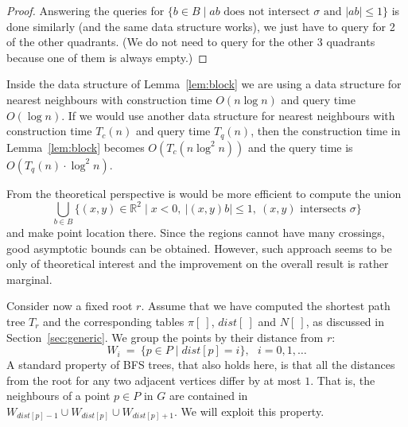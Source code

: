 \documentclass[a4paper,USenglish]{lipics}
\newcommand{\RR}{\ensuremath{\mathbb R}}  %
\def\dist{\mathit{dist}}
\let\le\leqslant
\begin{document}
\begin{proof}
	Answering the queries for 
	$\{ b\in B \mid \text{$ab$ does not intersect $\sigma$ and $|ab|\le 1$}\}$
	is done similarly (and the same data structure works), we just have
	to query for 2 of the other quadrants. (We do not need to query for the
	other 3 quadrants because one of them is always empty.)
\end{proof}

Inside the data structure of Lemma~\ref{lem:block} we are using a data structure
for nearest neighbours with construction time $O(n\log n)$ and query time $O(\log n)$.
If we would use another data structure for nearest neighbours with construction
time $T_c(n)$ and query time $T_q(n)$, then the construction time 
in Lemma~\ref{lem:block} becomes $O(T_c(n\log^2 n))$ and the query time is
$O(T_q(n)\cdot \log^2 n)$.

From the theoretical perspective is would be more efficient to compute the union
\[
	\bigcup_{b\in B} \{ (x,y)\in \RR^2\mid x<0,~ |(x,y)b|\le 1,~ (x,y) 
			\text{ intersects } \sigma \}
\]
and make point location there. Since the regions cannot have many crossings,
good asymptotic bounds can be obtained. However, such approach seems to be 
only of theoretical interest and the improvement on the overall result
is rather marginal.

Consider now a fixed root $r$. Assume that we have computed 
the shortest path tree $T_r$ and the corresponding tables $\pi[~]$, $\dist[~]$ and $N[~]$,
as discussed in Section~\ref{sec:generic}.
We group the points by their distance from $r$:
\[
	W_i ~=~ \{ p\in P \mid \dist[p]=i \},~~~ i=0,1,\dots
\]
A standard property of BFS trees, that also holds here,
is that all the distances from the root for any two adjacent vertices differ by at most $1$.
That is, the neighbours of a point $p\in P$ in $G$ are contained in
$W_{\dist[p]-1}\cup W_{\dist[p]} \cup W_{\dist[p]+1}$.
We will exploit this property.
\end{document}

